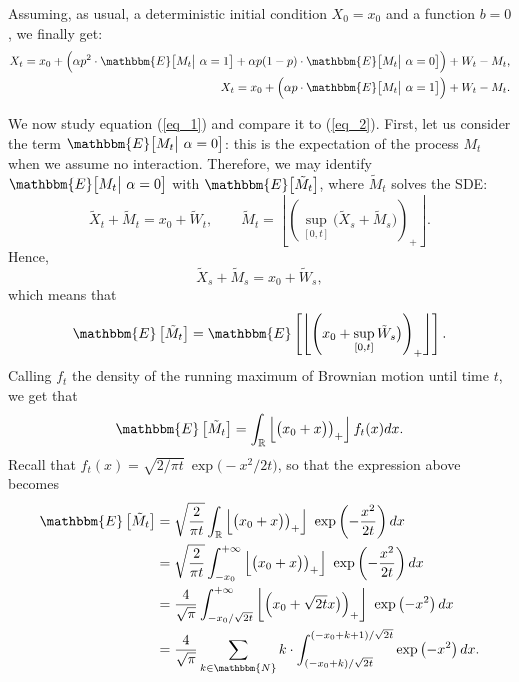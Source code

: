Assuming, as usual, a deterministic initial condition $X_0 = x_0$ and a function $b = 0$, we finally get:
\begin{align}
  X_t = x_0 + \Big( \alpha p^2 \cdot \mathbbm{E} \big[ M_t \big| \  \alpha = 1 \big. \big] + \alpha p (1-p) \cdot \mathbbm{E} \big[ M_t \big| \  \alpha = 0 \big. \big] \Big) + W_t - M_t, \label{eq_1} \\
  X_t = x_0 + \Big( \alpha p \cdot \mathbbm{E} \big[ M_t \big| \  \alpha = 1 \big. \big] \Big) + W_t - M_t. \label{eq_2}
\end{align}

We now study equation (\ref{eq_1}) and compare it to (\ref{eq_2}). First, let us consider the term $\mathbbm{E} \big[ M_t \big| \ \alpha = 0 \big. \big]$: this is the expectation of the process $M_t$ when we assume no interaction. Therefore, we may identify $\mathbbm{E} \big[ M_t \big| \ \alpha = 0 \big. \big]$ with $\mathbbm{E} \big[ \tilde{M}_t \big]$, where $\tilde{M}_t$ solves the SDE: \[ \tilde{X}_t + \tilde{M}_t = x_0 + \tilde{W}_t, \qquad \tilde{M}_t = \left\lfloor \left( \sup_{[0, t]} \big( \tilde{X}_s + \tilde{M}_s \big) \right)_+ \right\rfloor. \] Hence, \[ \tilde{X}_s + \tilde{M}_s = x_0 + \tilde{W}_s, \] which means that \[ \mathbbm{E} \left[ \tilde{M}_t \right] = \mathbbm{E} \left[ \left\lfloor \left( x_0 + \sup_{[0, t]} \tilde{W}_s \big) \right)_+ \right\rfloor \right] . \] Calling $f_t$ the density of the running maximum of Brownian motion until time $t$, we get that \[ \mathbbm{E} \left[ \tilde{M}_t \right] = \int_{\mathbb{R}} \left\lfloor \left( x_0 + x \big) \right)_+ \right\rfloor f_t(x) dx. \]
Recall that $f_t(x) = \sqrt{2/\pi t} \ \exp \big(- x^2 / 2t \big)$, so that the expression above becomes \begin{align*} \mathbbm{E}\left[ \tilde{M}_t \right] &= \sqrt{\frac{2}{\pi t}} \int_{\mathbb{R}} \left\lfloor \left( x_0 + x \big) \right)_+ \right\rfloor \ \exp \left( - \frac{x^2}{2t} \right) dx \\ &= \sqrt{\frac{2}{\pi t}} \int_{-x_0}^{+\infty} \left\lfloor \left( x_0 + x \big) \right)_+ \right\rfloor \ \exp \left( - \frac{x^2}{2t} \right) dx \\ &= \frac{4}{\sqrt{\pi}} \int_{-x_0 / \sqrt{2t}}^{+\infty} \left\lfloor \left( x_0 + \sqrt{2 t} x \big) \right)_+ \right\rfloor \ \exp \left( - x^2 \right) dx \\ &= \frac{4}{\sqrt{\pi}} \sum_{k \in \mathbbm{N}} k \cdot \int_{ (-x_0 + k) / \sqrt{2t}}^{ (-x_0 + k + 1) / \sqrt{2t}} \exp \left( - x^2 \right) dx. \end{align*}

